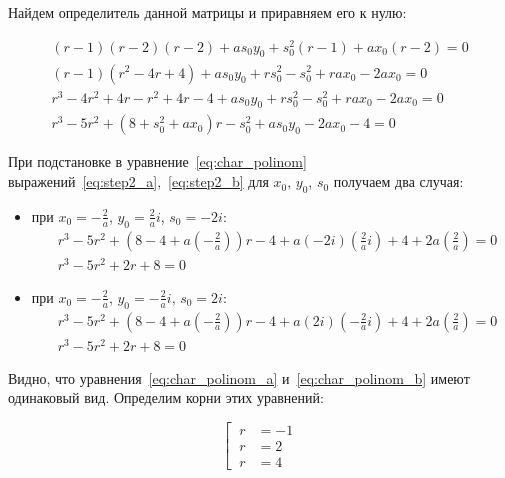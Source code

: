 Найдем определитель данной матрицы и приравняем его к нулю:

\begin{align}
\nonumber
(r-1)(r-2)(r-2) + as_0y_0 + s^2_0(r-1) + ax_0(r-2) = 0 \\ 
\nonumber
(r-1)(r^2-4r+4) + as_0y_0 + rs^2_0 - s^2_0 + rax_0 - 2ax_0 = 0 \\
\nonumber
r^3 - 4r^2 + 4r - r^2 + 4r - 4 + as_0y_0 + rs^2_0 - s^2_0 + rax_0 - 2ax_0 = 0 \\ 
\label{eq:char_polinom}
r^3 - 5r^2 + (8 + s^2_0 + ax_0)r - s^2_0 + as_0y_0 - 2ax_0 - 4 = 0 
\end{align}

При подстановке в уравнение~\ref{eq:char_polinom} выражений~\ref{eq:step2_a},~\ref{eq:step2_b} для $ x_0 $, $ y_0 $, $ s_0 $ получаем два случая:
\begin{itemize}

\item при $ x_0 = -\frac{2}{a} $, $ y_0 = \frac{2}{a}i $, $ s_0 = -2i $:
  \begin{align}
    \nonumber
    & r^3 - 5r^2 + (8 - 4 + a(-\frac{2}{a}))r - 4 + a(-2i)(\frac{2}{a}i) + 4 + 2a(\frac{2}{a}) = 0 \\
    \label{eq:char_polinom_a}
    & r^3 - 5r^2 + 2r + 8 = 0 
  \end{align}

\item при $ x_0 = -\frac{2}{a} $, $ y_0 = -\frac{2}{a}i $, $ s_0 = 2i $:
  \begin{align}
    \nonumber
    & r^3 - 5r^2 + (8 - 4 + a(-\frac{2}{a}))r - 4 + a(2i)(-\frac{2}{a}i) + 4 + 2a(\frac{2}{a}) = 0 \\
    \label{eq:char_polinom_b}
    & r^3 - 5r^2 + 2r + 8 = 0 
  \end{align}

\end{itemize}

Видно, что уравнения~\ref{eq:char_polinom_a} и~\ref{eq:char_polinom_b} имеют одинаковый вид.
Определим корни этих уравнений:

\begin{equation}
  \left[\
    \begin{aligned}
      r &= - 1 \\
      r &= 2 \\
      r &= 4
    \end{aligned}
  \right.
\end{equation}

\pagebreak
